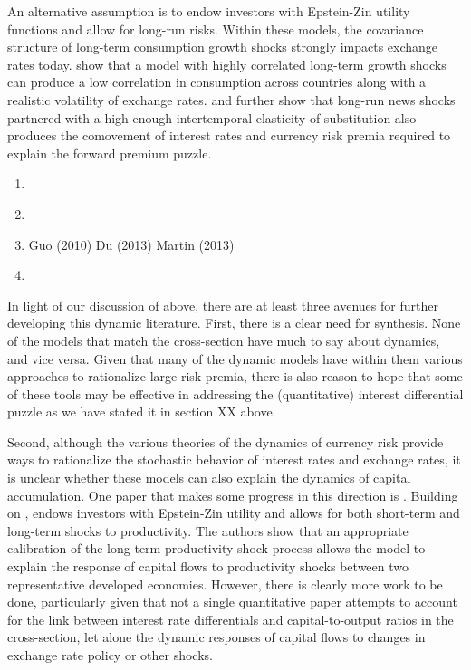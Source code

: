 \documentclass{ar-1col}
\begin{document}
An alternative assumption is to endow investors with Epstein-Zin utility functions and allow for long-run risks. Within these models, the covariance structure of long-term consumption growth shocks strongly impacts exchange rates today. \citet{ColacitoCroce2011} show that a model with highly correlated long-term growth shocks can produce a low correlation in consumption across countries along with a realistic volatility of exchange rates. \citet{BansalShaliastovich2012} and \citet{ColacitoCroce2013} further show that long-run news shocks partnered with a high enough intertemporal elasticity of substitution also produces the comovement of interest rates and currency risk premia required to explain the forward premium puzzle. 

\begin{enumerate}
    \item \citet{GourioSiemerVerdelhan2013}
    \item \citet{FarhiGabaix2016}
    \item Guo (2010) Du (2013) Martin (2013)
    \item \citet{Backusetal2001}
\end{enumerate}

 



In light of our discussion of above, there are at least three avenues for further developing this dynamic literature. First, there is a clear need for synthesis. None of the models that match the cross-section have much to say about dynamics, and vice versa. Given that many of the dynamic models have within them various approaches to rationalize large risk premia, there is also reason to hope that some of these tools may be effective in addressing the (quantitative) interest differential puzzle as we have stated it in section XX above. 

Second, although the various theories of the dynamics of currency risk provide ways to rationalize the stochastic behavior of interest rates and exchange rates, it is unclear whether these models can also explain the dynamics of capital accumulation. One paper that makes some progress in this direction is \citet{ColacitoCroceHoHoward2018}. Building on \citet{ColacitoCroce2011, ColacitoCroce2013}, \citet{ColacitoCroceHoHoward2018} endows investors with Epstein-Zin utility and allows for both short-term and long-term shocks to productivity. The authors show that an appropriate calibration of the long-term productivity shock process allows the model to explain
the response of capital flows to productivity shocks between two representative developed economies. However, there is clearly more work to be done, particularly given that not a single quantitative paper attempts to account for the link between interest rate differentials and capital-to-output ratios in the cross-section, let alone the dynamic responses of capital flows to changes in exchange rate policy or other shocks.
\end{document}
